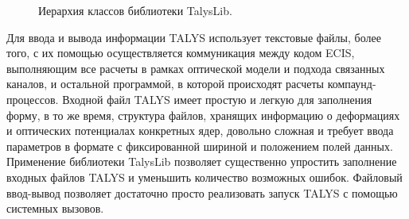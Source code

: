 \documentclass[a4paper,12pt]{extarticle}
\begin{document}
\begin{figure}
\caption{Иерархия классов библиотеки TalysLib.}
\label{fig:TalysLibStructure}
\end{figure}
Для ввода и вывода информации TALYS использует текстовые файлы, более того, с их помощью осуществляется коммуникация между кодом ECIS, выполняющим все расчеты в рамках оптической модели и подхода связанных каналов, и остальной программой, в которой происходят расчеты компаунд-процессов. Входной файл TALYS имеет простую и легкую для заполнения форму, в то же время, структура файлов, хранящих информацию о деформациях и оптических потенциалах конкретных ядер, довольно сложная и требует ввода параметров в формате с фиксированной шириной и положением полей данных. Применение библиотеки TalysLib позволяет существенно упростить заполнение входных файлов TALYS и уменьшить количество возможных ошибок. Файловый ввод-вывод позволяет достаточно просто реализовать запуск TALYS с помощью системных вызовов.
\end{document}
